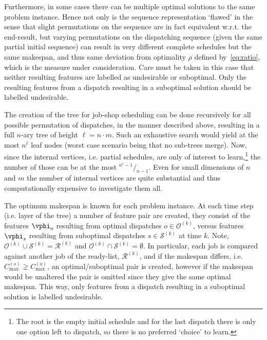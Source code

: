 \documentclass[smallextended]{llncs}
\begin{document}
Furthermore, in some cases there can be multiple optimal solutions to the same problem instance. Hence not only is the 
sequence representation `flawed' in the sense that slight permutations on the sequence are in fact equivalent w.r.t. 
the end-result, but varying permutations on the dispatching sequence (given the same partial initial sequence) can 
result in very different complete schedules but the same makespan, and thus same deviation from optimality $\rho$ 
defined by~\eqref{eq:ratio}, which is the measure under consideration. Care must be taken in this case that neither 
resulting features are labelled as undesirable or suboptimal. Only the resulting features from a dispatch resulting in 
a suboptimal solution should be labelled undesirable. 

The creation of the tree for job-shop scheduling can be done recursively for all possible permutation of dispatches, 
in the manner described above, resulting in a full \mbox{$n$-ary} tree %
of height $\ell=n\cdot m$. Such an exhaustive search would yield at the most $n^{\ell}$ leaf nodes (worst case scenario being that no sub-trees merge). Now, since the internal vertices, i.e. partial schedules, are only of interest to learn,\footnote{The root is the empty initial schedule and for the last dispatch there is only one option left to dispatch, so there is no preferred `choice' to learn.} the number of those can be at the most \mbox{${}^{n^{\ell}-1}/_{n-1}$}.
Even for small dimensions of $n$ and $m$ the number of internal vertices are quite substantial and thus 
computationally expensive to investigate them all. 



The optimum makespan is known for each problem instance. 
At each time step (i.e. layer of the tree) a number of feature pair are created, they consist of the features 
$\vphi_o$ resulting from optimal dispatches $o\in\mathcal{O}^{(k)}$, versus features $\vphi_s$ resulting from 
suboptimal dispatches $s\in\mathcal{S}^{(k)}$ at time $k$. Note, 
$\mathcal{O}^{(k)}\cup\mathcal{S}^{(k)}=\mathcal{R}^{(k)}$ and $\mathcal{O}^{(k)}\cap\mathcal{S}^{(k)}=\emptyset$.
In particular, each job is compared against another job of the ready-list, $\mathcal{R}^{(k)}$, and if the makespan differs, i.e. $C_{\max}^{(s)}\gneq C_{\max}^{(o)}$, an optimal/suboptimal pair is created, however if the makespan would be unaltered the pair is omitted since they give the same optimal makespan. This way, only features from a dispatch resulting in a suboptimal solution is labelled undesirable.
\end{document}
